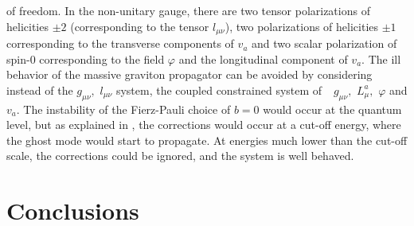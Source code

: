 \documentclass[a4paper,12pt]{article}
\begin{document}
of freedom. In the non-unitary gauge, there are two tensor polarizations of
helicities $\pm2$ (corresponding to the tensor $l_{\mu\nu}$), two
polarizations of helicities $\pm1$ corresponding to the transverse components
of $v_{a}$ and two scalar polarization of spin-0 corresponding to the field
$\varphi$ and the longitudinal component of $v_{a}.$ The ill behavior of the
massive graviton propagator can be avoided by considering instead of the
$g_{\mu\nu},$ $l_{\mu\nu}$ system, the coupled constrained system of
$\ $\ $g_{\mu\nu},$ $L_{\mu}^{a},$ $\varphi$ and $v_{a}$. The instability of
the Fierz-Pauli choice of $b=0$ would occur at the quantum level, but as
explained in \cite{ags}, the corrections would occur at a cut-off energy,
where the ghost mode would start to propagate. At energies much lower than the
cut-off scale, the corrections could be ignored, and the system is well behaved.

\section{Conclusions}
\end{document}
